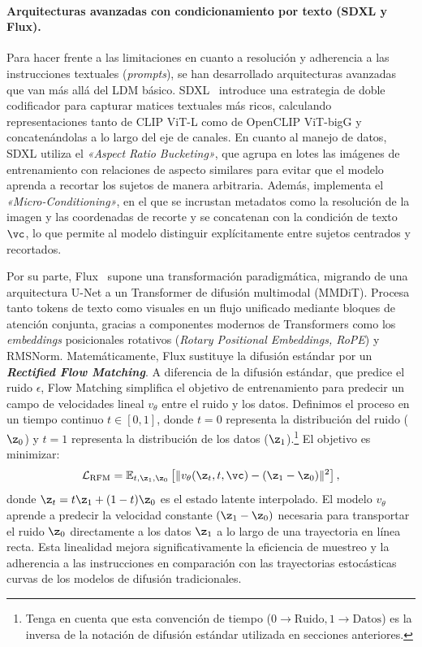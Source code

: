 \documentclass[../../book-main_es.tex]{subfiles}
\begin{document}
\paragraph{Arquitecturas avanzadas con condicionamiento por texto (SDXL y Flux).}
Para hacer frente a las limitaciones en cuanto a resolución y adherencia a las instrucciones textuales (\textit{prompts}), se han 
desarrollado arquitecturas avanzadas que van más allá del LDM básico. SDXL~\citep{podell2023sdxl} 
introduce una estrategia de doble codificador para capturar matices textuales más ricos, calculando 
representaciones tanto de CLIP ViT-L como de OpenCLIP ViT-bigG y concatenándolas a lo largo del 
eje de canales. En cuanto al manejo de datos, SDXL utiliza el \textit{«Aspect Ratio Bucketing»}, 
que agrupa en lotes las imágenes de entrenamiento con relaciones de aspecto similares para evitar 
que el modelo aprenda a recortar los sujetos de manera arbitraria. Además, implementa el 
\textit{«Micro-Conditioning»}, en el que se incrustan metadatos como la resolución de la 
imagen y las coordenadas de recorte y se concatenan con la condición de texto $\vc$, lo 
que permite al modelo distinguir explícitamente entre sujetos centrados y recortados.

Por su parte, Flux~\citep{flux2024} supone una transformación paradigmática, migrando de una arquitectura 
U-Net a un Transformer de difusión multimodal (MMDiT). Procesa tanto tokens de texto como visuales en 
un flujo unificado mediante bloques de atención conjunta, gracias a componentes modernos de 
Transformers como los \textit{embeddings} posicionales rotativos (\textit{Rotary Positional Embeddings, RoPE}) y RMSNorm. Matemáticamente, 
Flux sustituye la difusión estándar por un \textbf{\textit{Rectified Flow Matching}}. A diferencia de la 
difusión estándar, que predice el ruido $\epsilon$, Flow Matching simplifica el objetivo de 
entrenamiento para predecir un campo de velocidades lineal $v_\theta$ entre el ruido y los datos. 
Definimos el proceso en un tiempo continuo $t \in [0, 1]$, donde $t=0$ representa la distribución 
del ruido ($\z_0$) y $t=1$ representa la distribución de los datos ($\z_1$).\footnote{Tenga en 
cuenta que esta convención de tiempo ($0 \to \text{Ruido}, 1 \to \text{Datos}$) es la inversa de 
la notación de difusión estándar utilizada en secciones anteriores.} El objetivo es minimizar:
\begin{equation}
    \mathcal{L}_{\text{RFM}} = \mathbb{E}_{t, \z_1, \z_0} \left[ \| v_\theta(\z_t, t, \vc) - (\z_1 - \z_0) \|^2 \right],
\end{equation}
donde $\z_t = t \z_1 + (1-t) \z_0$ es el estado latente interpolado. El modelo $v_\theta$ aprende 
a predecir la velocidad constante $(\z_1 - \z_0)$ necesaria para transportar el ruido $\z_0$ 
directamente a los datos $\z_1$ a lo largo de una trayectoria en línea recta. Esta linealidad mejora 
significativamente la eficiencia de muestreo y la adherencia a las instrucciones en comparación con las 
trayectorias estocásticas curvas de los modelos de difusión tradicionales.
\end{document}
